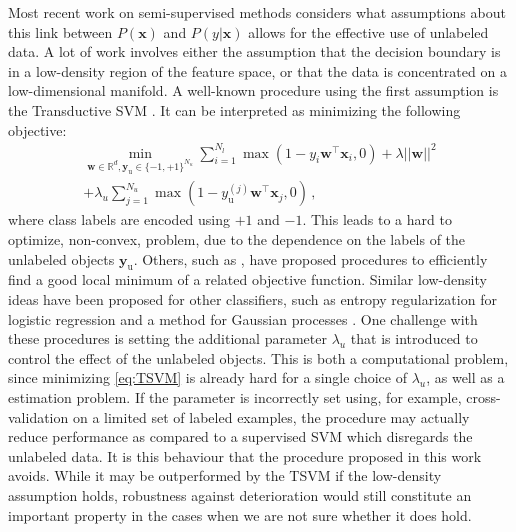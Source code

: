 \documentclass[smallcondensed]{svjour3}\usepackage[]{graphicx}\usepackage[]{color}
\renewcommand{\vec}[1]{\mathbf{#1}}
\begin{document}
Most recent work on semi-supervised methods considers what assumptions about this link between $P(\vec{x})$ and $P(y|\vec{x})$ allows for the effective use of unlabeled data. A lot of work involves either the assumption that the decision boundary is in a low-density region of the feature space, or that the data is concentrated on a low-dimensional manifold. A well-known procedure using the first assumption is the Transductive SVM \citep{Joachims1999}. It can be interpreted as minimizing the following objective:
\begin{multline}
\label{eq:TSVM}
\min_{\vec{w} \in \mathbb{R}^d,\vec{y}_\text{u} \in \{-1,+1\}^{N_u}} \sum_{i=1}^{N_l} \max(1-y_i \vec{w}^\top \vec{x}_i,0) + \lambda ||\vec{w}||^2 \\ + \lambda_u \sum_{j=1}^{N_u} \max(1-y_\text{u}^{(j)} \vec{w}^\top \vec{x}_j,0) \,,
\end{multline}
where class labels are encoded using $+1$ and $-1$. This leads to a hard to optimize, non-convex, problem, due to the dependence on the labels of the unlabeled objects $\vec{y}_\text{u}$. Others, such as \citet{Sindhwani2006}, have proposed procedures to efficiently find a good local minimum of a related objective function. Similar low-density ideas have been proposed for other classifiers, such as entropy regularization for logistic regression \citep{Grandvalet2005} and a method for Gaussian processes \citep{Lawrence2004}. One challenge with these procedures is setting the additional parameter $\lambda_u$ that is introduced to control the effect of the unlabeled objects. This is both a computational problem, since minimizing \eqref{eq:TSVM} is already hard for a single choice of $\lambda_u$, as well as a estimation problem. If the parameter is incorrectly set using, for example, cross-validation on a limited set of labeled examples, the procedure may actually reduce performance as compared to a supervised SVM which disregards the unlabeled data. It is this behaviour that the procedure proposed in this work avoids. While it may be outperformed by the TSVM if the low-density assumption holds, robustness against deterioration would still constitute an important property in the cases when we are not sure whether it does hold.
\end{document}
